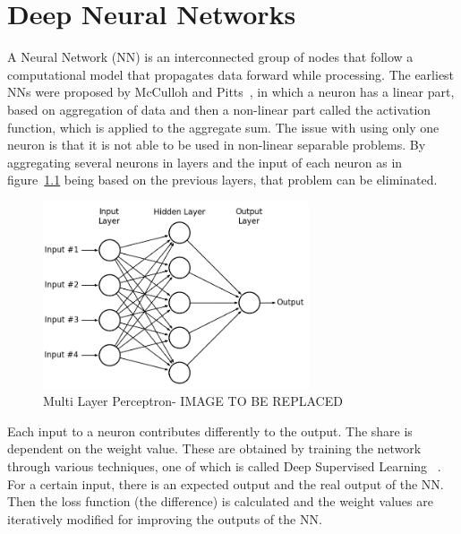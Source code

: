 \chapter{Deep Neural Networks}
\label{chapter:cnn}



A Neural Network (NN) is an interconnected group of nodes that follow a
computational model that propagates data forward while processing. The earliest
NNs were proposed by McCulloh and Pitts~\cite{neuron:model}, in which a neuron
has a linear part, based on aggregation of data and then a non-linear part
called the activation function, which is applied to the aggregate sum. The issue
with using only one neuron is that it is not able to be used in non-linear
separable problems. By aggregating several neurons in layers and the input of
each neuron as in figure~\ref{MLP} being based on the previous layers, that
problem can be eliminated.

\begin{figure}[!htbp]
    \centering
    \includegraphics[width=0.7\textwidth]{Figures/mlp-tobereplaced.png}
    \caption{Multi Layer Perceptron- IMAGE TO BE REPLACED}
    \label{MLP}
\end{figure} 

Each input to a neuron contributes differently to the output. The share is
dependent on the weight value. These are obtained by training the network
through various techniques, one of which is called Deep Supervised
Learning~\cite{deeplearning} . For a certain input, there is an expected output
and the real output of the NN. Then the loss function (the difference) is
calculated and the weight values are iteratively modified for improving the
outputs of the NN.

